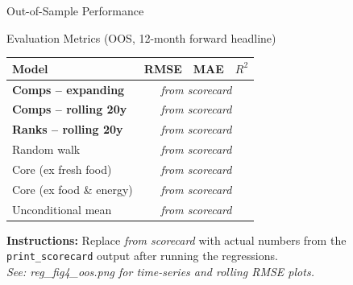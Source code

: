 \documentclass[aspectratio=169, 11pt]{beamer}
\begin{document}
\begin{frame}{Out-of-Sample Performance}
  \begin{block}{Evaluation Metrics (OOS, 12-month forward headline)}
    \centering
    \small
    \begin{tabular}{lccc}
      \toprule
      \textbf{Model} & \textbf{RMSE} & \textbf{MAE} & \textbf{$R^2$} \\
      \midrule
      \textbf{Comps -- expanding} & \multicolumn{3}{c}{\textit{from scorecard}} \\
      \textbf{Comps -- rolling 20y} & \multicolumn{3}{c}{\textit{from scorecard}} \\
      \textbf{Ranks -- rolling 20y} & \multicolumn{3}{c}{\textit{from scorecard}} \\
      \midrule
      Random walk & \multicolumn{3}{c}{\textit{from scorecard}} \\
      Core (ex fresh food) & \multicolumn{3}{c}{\textit{from scorecard}} \\
      Core (ex food \& energy) & \multicolumn{3}{c}{\textit{from scorecard}} \\
      Unconditional mean & \multicolumn{3}{c}{\textit{from scorecard}} \\
      \bottomrule
    \end{tabular}
  \end{block}
  \vspace{4pt}
  \small
  \textbf{Instructions:} Replace \textit{from scorecard} with actual numbers from the
  \texttt{print\_scorecard} output after running the regressions.\\[4pt]
  \textit{See: reg\_fig4\_oos.png for time-series and rolling RMSE plots.}
\end{frame}
\end{document}

